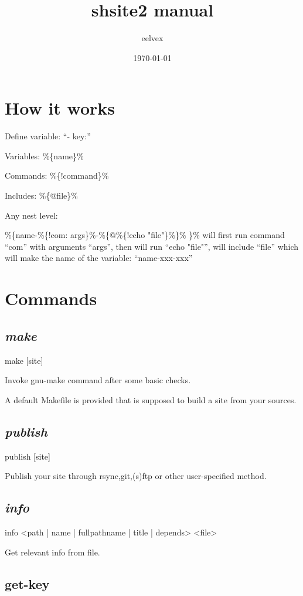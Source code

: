 \documentclass{memoir}
\title{shsite2 manual}
\author{eelvex}
\date{\today}
\newcommand{\var}[1]{\%\{#1\}\%}
\begin{document}
\begin{titlingpage}
\maketitle
\end{titlingpage}
\tableofcontents

\chapter{How it works} %

Define variable: ``- key:''

Variables: \var{name}

Commands: \var{!command}

Includes:  \var{@file}

Any nest level:

\var{name-\var{!com: args}-\var{@\var{!echo "file"}} }
will first run command ``com'' with arguments ``args'', then will run ``echo "file"'', will include ``file''
which will make the name of the variable: ``name-xxx-xxx''




\chapter{Commands} %

	\section{\emph{make}} %
	make [site]

	Invoke gnu-make command after some basic checks.

	A default Makefile is provided that is supposed to build a site from your sources.
	\section{\emph{publish}} %
	publish [site]

	Publish your site through rsync,git,(s)ftp or other user-specified method.
	\section{\emph{info}}
	info <path | name | fullpathname | title | depends> <file>

	Get relevant info from file.
	\section{get-key}
\end{document}
